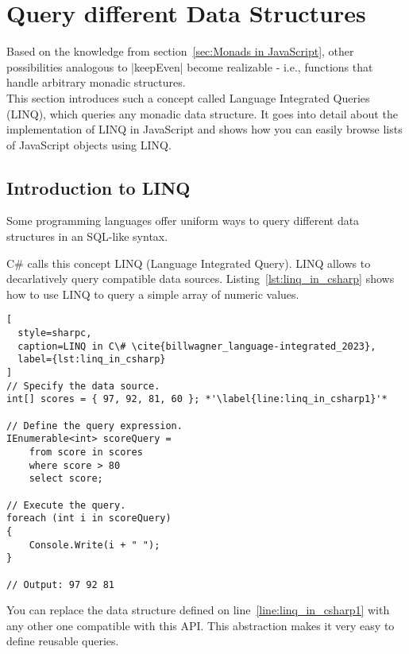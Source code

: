 \section{Query different Data Structures}
\label{sec:Query different Data Structures}
Based on the knowledge from section~\ref{sec:Monads in JavaScript}, other
possibilities analogous to |keepEven| become realizable - i.e., functions that
handle arbitrary monadic structures. \\ 
This section introduces such a concept called Language Integrated Queries
(LINQ), which queries any monadic data structure. It goes into detail
about the implementation of LINQ in JavaScript and shows how you can easily
browse lists of JavaScript objects using LINQ.
\subsection{Introduction to LINQ} %
\label{sub:Introduction to LINQ}
Some programming languages offer uniform ways to query different data
structures in an SQL-like syntax.

C\# calls this concept LINQ (Language Integrated Query). LINQ allows to
decarlatively query compatible data sources. Listing~\ref{lst:linq_in_csharp}
shows how to use LINQ to query a simple array of numeric values.

\begin{lstlisting}[
  style=sharpc,
  caption=LINQ in C\# \cite{billwagner_language-integrated_2023},
  label={lst:linq_in_csharp}
]
// Specify the data source.
int[] scores = { 97, 92, 81, 60 }; *'\label{line:linq_in_csharp1}'*

// Define the query expression.
IEnumerable<int> scoreQuery =
    from score in scores
    where score > 80
    select score;

// Execute the query.
foreach (int i in scoreQuery)
{
    Console.Write(i + " ");
}

// Output: 97 92 81
\end{lstlisting}

You can replace the data structure defined on line~\ref{line:linq_in_csharp1}
with any other one compatible with this API. This abstraction makes it very
easy to define reusable queries.


